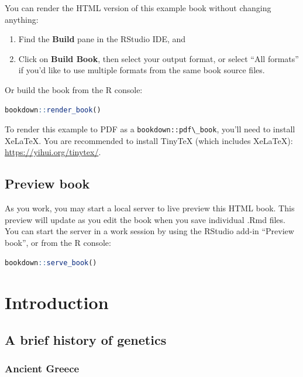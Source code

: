 \documentclass[
  9pt,
]{book}
\newcommand{\passthrough}[1]{#1}
\begin{document}
You can render the HTML version of this example book without changing anything:

\begin{enumerate}
\def\labelenumi{\arabic{enumi}.}
\item
  Find the \textbf{Build} pane in the RStudio IDE, and
\item
  Click on \textbf{Build Book}, then select your output format, or select ``All formats'' if you'd like to use multiple formats from the same book source files.
\end{enumerate}

Or build the book from the R console:

\begin{lstlisting}[language=R]
bookdown::render_book()
\end{lstlisting}

To render this example to PDF as a \passthrough{\lstinline!bookdown::pdf\_book!}, you'll need to install XeLaTeX. You are recommended to install TinyTeX (which includes XeLaTeX): \url{https://yihui.org/tinytex/}.

\hypertarget{preview-book}{%
\section{Preview book}\label{preview-book}}

As you work, you may start a local server to live preview this HTML book. This preview will update as you edit the book when you save individual .Rmd files. You can start the server in a work session by using the RStudio add-in ``Preview book'', or from the R console:

\begin{lstlisting}[language=R]
bookdown::serve_book()
\end{lstlisting}

\hypertarget{introduction}{%
\chapter{Introduction}\label{introduction}}

\hypertarget{a-brief-history-of-genetics}{%
\section{A brief history of genetics}\label{a-brief-history-of-genetics}}

\hypertarget{ancient-greece}{%
\subsection{Ancient Greece}\label{ancient-greece}}
\end{document}
